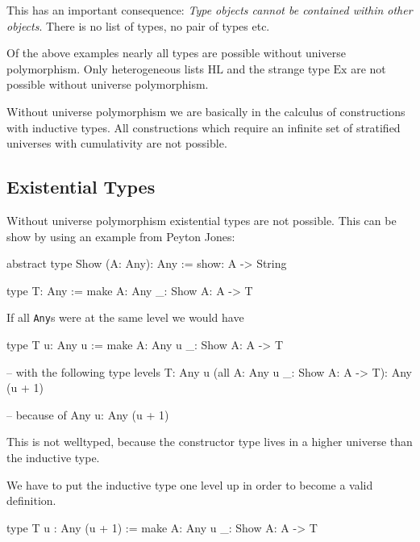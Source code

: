 This has an important consequence: \emph{Type objects cannot be contained within
other objects}. There is no list of types, no pair of types etc.

Of the above examples nearly all types are possible without universe
polymorphism. Only heterogeneous lists $\text{HL}$ and the strange type
$\text{Ex}$ are not possible without universe polymorphism.

Without universe polymorphism we are basically in the calculus of constructions
with inductive types. All constructions which require an infinite set of
stratified universes with cumulativity are not possible.





\subsection{Existential Types}

Without universe polymorphism existential types are not possible.
This can be show by using an example from Peyton Jones:

\begin{alba}
    abstract type Show (A: Any): Any :=
        show: A -> String

    type T: Any :=
        make {A: Any} {_: Show A}: A -> T
\end{alba}

If all {\tt Any}s were at the same level we would have
\begin{alba}
    type T {u}: Any u :=
        make {A: Any u} {_: Show A}: A -> T

    -- with the following type levels
    T:                                      Any u
    (all {A: Any u} {_: Show A}: A -> T):   Any (u + 1)

    -- because of
    Any u: Any (u + 1)
\end{alba}
%
This is not welltyped, because the constructor type lives in a higher universe
than the inductive type.

We have to put the inductive type one level up in order to become a valid
definition.

\begin{alba}
    type T {u} : Any (u + 1) :=
        make {A: Any u} {_: Show A}: A -> T
\end{alba}
